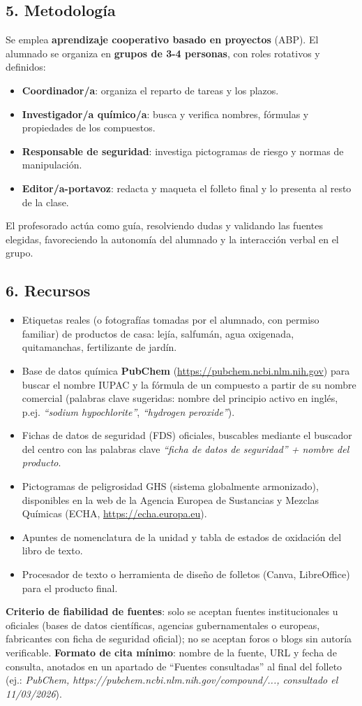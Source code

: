 \documentclass[11pt,a4paper]{article}
\begin{document}
\subsection*{5. Metodología}
Se emplea \textbf{aprendizaje cooperativo basado en proyectos} (ABP). El alumnado se organiza en \textbf{grupos de 3-4 personas}, con roles rotativos y definidos:
\begin{itemize}
    \item \textbf{Coordinador/a}: organiza el reparto de tareas y los plazos.
    \item \textbf{Investigador/a químico/a}: busca y verifica nombres, fórmulas y propiedades de los compuestos.
    \item \textbf{Responsable de seguridad}: investiga pictogramas de riesgo y normas de manipulación.
    \item \textbf{Editor/a-portavoz}: redacta y maqueta el folleto final y lo presenta al resto de la clase.
\end{itemize}
El profesorado actúa como guía, resolviendo dudas y validando las fuentes elegidas, favoreciendo la autonomía del alumnado y la interacción verbal en el grupo.

\subsection*{6. Recursos}
\begin{itemize}
    \item Etiquetas reales (o fotografías tomadas por el alumnado, con permiso familiar) de productos de casa: lejía, salfumán, agua oxigenada, quitamanchas, fertilizante de jardín.
    \item Base de datos química \textbf{PubChem} (\url{https://pubchem.ncbi.nlm.nih.gov}) para buscar el nombre IUPAC y la fórmula de un compuesto a partir de su nombre comercial (palabras clave sugeridas: nombre del principio activo en inglés, p.ej. \textit{``sodium hypochlorite''}, \textit{``hydrogen peroxide''}).
    \item Fichas de datos de seguridad (FDS) oficiales, buscables mediante el buscador del centro con las palabras clave \textit{``ficha de datos de seguridad'' + nombre del producto}.
    \item Pictogramas de peligrosidad GHS (sistema globalmente armonizado), disponibles en la web de la Agencia Europea de Sustancias y Mezclas Químicas (ECHA, \url{https://echa.europa.eu}).
    \item Apuntes de nomenclatura de la unidad y tabla de estados de oxidación del libro de texto.
    \item Procesador de texto o herramienta de diseño de folletos (Canva, LibreOffice) para el producto final.
\end{itemize}
\textbf{Criterio de fiabilidad de fuentes}: solo se aceptan fuentes institucionales u oficiales (bases de datos científicas, agencias gubernamentales o europeas, fabricantes con ficha de seguridad oficial); no se aceptan foros o blogs sin autoría verificable. \textbf{Formato de cita mínimo}: nombre de la fuente, URL y fecha de consulta, anotados en un apartado de ``Fuentes consultadas'' al final del folleto (ej.: \textit{PubChem, https://pubchem.ncbi.nlm.nih.gov/compound/..., consultado el 11/03/2026}).
\end{document}

